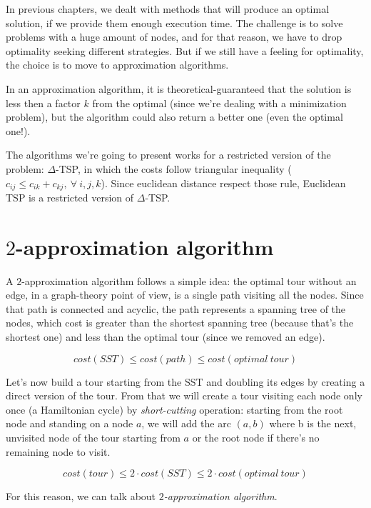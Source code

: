 In previous chapters, we dealt with methods that will produce an optimal
solution, if we provide them enough execution time. The challenge is to solve
problems with a huge amount of nodes, and for that reason, we have to drop
optimality seeking different strategies. But if we still have a feeling for
optimality, the choice is to move to approximation algorithms.

In an approximation algorithm, it is theoretical-guaranteed that the solution
is less then a factor $k$ from the optimal (since we're dealing with a
minimization problem), but the algorithm could also return a better one (even
the optimal one!).

The algorithms we're going to present works for a restricted version of the
problem: $\Delta$-TSP, in which the costs follow triangular inequality ($c_{ij}
\le c_{ik} + c_{kj},\ \forall\ i,j,k$). Since euclidean distance respect those
rule, Euclidean TSP is a restricted version of $\Delta$-TSP.

\section{$2$-approximation algorithm}
A $2$-approximation algorithm follows a simple idea: the optimal tour without an
edge, in a graph-theory point of view, is a single path visiting all the nodes.
Since that path is connected and acyclic, the path represents a spanning tree of
the nodes, which cost is greater than the shortest spanning tree (because that's
the shortest one) and less than the optimal tour (since we removed an edge).

\begin{equation*}
    cost(SST) \leq cost(path) \leq cost(optimal\ tour)
\end{equation*}

Let's now build a tour starting from the SST and doubling its edges by creating
a direct version of the tour. From that we will create a tour visiting each node
only once (a Hamiltonian cycle) by \emph{short-cutting} operation: starting
from the root node and standing on a node $a$, we will add the arc $(a,b)$ where
b is the next, unvisited node of the tour starting from $a$ or the root node if
there's no remaining node to visit. 

\begin{equation*}
    cost(tour) \leq 2 \cdot cost(SST) \leq 2 \cdot cost(optimal\ tour)
\end{equation*}

For this reason, we can talk about \emph{$2$-approximation algorithm}.

